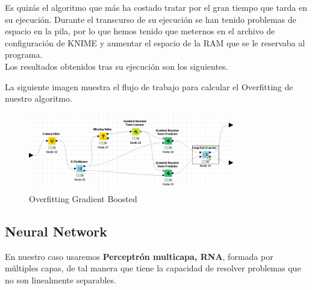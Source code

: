	Es quizás el algoritmo que más ha costado tratar por el gran tiempo que tarda en su ejecución. Durante el transcurso de su ejecución se han tenido problemas de espacio en la pila, por lo que hemos tenido que meternos en el archivo de configuración de KNIME y aumentar el espacio de la RAM que se le reservaba al programa. \\
	
	
	Los resultados obtenidos tras su ejecución son los siguientes.
	\begin{table}[h]
	\end{table}
	
	
	La siguiente imagen muestra el flujo de trabajo para calcular el Overfitting de nuestro algoritmo.
	
	\begin{figure}[H]
		\centering
		\includegraphics[width=0.8\textwidth]{img/gbover.png}
		\caption{Overfitting Gradient Boosted}
	\end{figure}
	
	\subsection{Neural Network}
	\hspace{1cm} En nuestro caso usaremos \textbf{Perceptrón multicapa, RNA}, formada por múltiples capas, de tal manera que tiene la capacidad de resolver problemas que no son linealmente separables.
	
